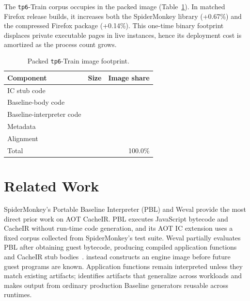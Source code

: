 \documentclass[sigplan,screen,review,anonymous]{acmart}
\newcommand{\libxulgrowthpct}{0.67\%}
\newcommand{\browserpackagegrowthpct}{0.14\%}
\newcommand{\AM}{\leavevmode{\sc AmberMonkey}}
\begin{document}
The {\tt tp6}-Train corpus occupies \corpuspacked{} in the packed image (Table~\ref{tab:image-footprint}). In matched Firefox release builds, it increases both the SpiderMonkey library (+\libxulgrowthpct{}) and the compressed Firefox package (+\browserpackagegrowthpct{}). This one-time binary footprint displaces private executable pages in live instances, hence its deployment cost is amortized as the process count grows.

\begin{table}[t]
  \caption{Packed {\tt tp6}-Train image footprint.}
  \label{tab:image-footprint}
  \centering
  \footnotesize
  \begin{tabular}{lrr}
    \toprule
    Component & Size & Image share \\
    \midrule
    IC stub code & \icstubcodesize{} & \icstubimageshare{} \\
    Baseline-body code & \baselinebodycodesize{} & \baselinebodyimageshare{} \\
    Baseline-interpreter code & \baselineinterpretercodesize{} & \baselineinterpreterimageshare{} \\
    Metadata & \imagemetadatasize{} & \imagemetadatashare{} \\
    Alignment & \imagealignmentsize{} & \imagealignmentshare{} \\
    \midrule
    Total & \aotimagekilobytes{} & 100.0\% \\
    \bottomrule
  \end{tabular}
\end{table}


\section{Related Work}

SpiderMonkey's Portable Baseline Interpreter (PBL) and Weval provide the most direct prior work on AOT CacheIR. PBL executes JavaScript bytecode and CacheIR without run-time code generation, and its AOT IC extension uses a fixed corpus collected from SpiderMonkey's test suite. Weval partially evaluates PBL after obtaining guest bytecode, producing compiled application functions and CacheIR stub bodies~\cite{fallin2025weval,futamura1971partial}. \AM{} instead constructs an engine image before future guest programs are known. Application functions remain interpreted unless they match existing artifacts; \AM{} identifies artifacts that generalize across workloads and makes output from ordinary production Baseline generators reusable across runtimes.
\end{document}
